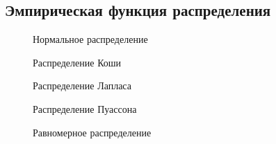 \subsection{Эмпирическая функция распределения}

\begin{figure}[h]
\caption{Нормальное распределение}
\label{fig:box20}
\end{figure}

\begin{figure}[h]
\caption{Распределение Коши}
\label{fig:box20}
\end{figure}

\begin{figure}[h]
\caption{Распределение Лапласа}
\label{fig:box20}
\end{figure}

\begin{figure}[h]
\caption{Распределение Пуассона}
\label{fig:box20}
\end{figure}

\begin{figure}[h]
\caption{Равномерное распределение}
\label{fig:box20}
\end{figure}
